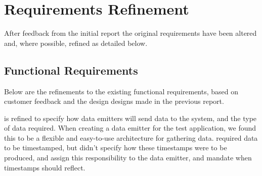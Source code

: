 \section{Requirements Refinement}
\label{sec:requirements}
After feedback from the initial report the original requirements have been altered and, where possible, refined as detailed below.

\subsection{Functional Requirements}
\label{sec:requirements-functional}
Below are the refinements to the existing functional requirements, based on customer feedback and the design designs made in the previous report.

 is refined to specify how data emitters will send data to the system, and the type of data required. When creating a data emitter for the test application, we found this to be a flexible and easy-to-use architecture for gathering data. 
 required data to be timestamped, but didn't specify how these timestamps were to be produced,  and  assign this
responsibility to the data emitter, and mandate when timestamps
should reflect.


